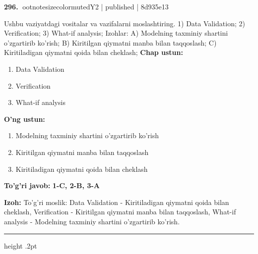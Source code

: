 \documentclass[10pt,a4paper]{article}
\begin{document}
\textbf{\color{ink}296.} {ootnotesizecolor{muted}Y2 | published | 8d935e13}
\par
Ushbu vaziyatdagi vositalar va vazifalarni moslashtiring.  1) Data Validation;  2) Verification;  3) What-if analysis;  Izohlar: A) Modelning taxminiy shartini o'zgartirib ko'rish;  B) Kiritilgan qiymatni manba bilan taqqoslash;  C) Kiritiladigan qiymatni qoida bilan cheklash;
\textbf{Chap ustun:}\begin{enumerate}[label=\arabic*),leftmargin=9mm]
\item Data Validation
\item Verification
\item What-if analysis
\end{enumerate}
\textbf{O'ng ustun:}\begin{enumerate}[label=\Alph*),leftmargin=9mm]
\item Modelning taxminiy shartini o'zgartirib ko'rish
\item Kiritilgan qiymatni manba bilan taqqoslash
\item Kiritiladigan qiymatni qoida bilan cheklash
\end{enumerate}
\begin{tcolorbox}[enhanced,breakable,colback=teal!4,colframe=teal!55!black,boxrule=0.45pt,arc=1.2mm,left=2.8mm,right=2.8mm,top=2mm,bottom=2mm]
\textbf{\color{teal}To'g'ri javob:} \textbf{1-C, 2-B, 3-A}
\par\smallskip
\textbf{Izoh:} To'g'ri moslik: Data Validation - Kiritiladigan qiymatni qoida bilan cheklash, Verification - Kiritilgan qiymatni manba bilan taqqoslash, What-if analysis - Modelning taxminiy shartini o'zgartirib ko'rish.
\end{tcolorbox}
\vspace{2mm}\hrule height .2pt\vspace{2mm}
\end{document}
